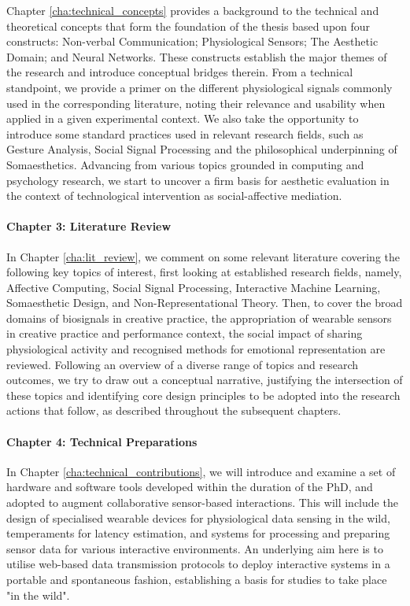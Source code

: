 Chapter \ref{cha:technical_concepts} provides a background to the technical and theoretical concepts that form the foundation of the thesis based upon four constructs: Non-verbal Communication; Physiological Sensors; The Aesthetic Domain; and Neural Networks. These constructs establish the major themes of the research and introduce conceptual bridges therein. From a technical standpoint, we provide a primer on the different physiological signals commonly used in the corresponding literature, noting their relevance and usability when applied in a given experimental context. We also take the opportunity to introduce some standard practices used in relevant research fields, such as Gesture Analysis, Social Signal Processing and the philosophical underpinning of Somaesthetics. Advancing from various topics grounded in computing and psychology research, we start to uncover a firm basis for aesthetic evaluation in the context of technological intervention as social-affective mediation.

\paragraph{Chapter 3: Literature Review}

In Chapter \ref{cha:lit_review}, we comment on some relevant literature covering the following key topics of interest, first looking at established research fields, namely, Affective Computing, Social Signal Processing, Interactive Machine Learning, Somaesthetic Design, and Non-Representational Theory. Then, to cover the broad domains of biosignals in creative practice, the appropriation of wearable sensors in creative practice and performance context, the social impact of sharing physiological activity and recognised methods for emotional representation are reviewed. Following an overview of a diverse range of topics and research outcomes, we try to draw out a conceptual narrative, justifying the intersection of these topics and identifying core design principles to be adopted into the research actions that follow, as described throughout the subsequent chapters. 

\paragraph{Chapter 4: Technical Preparations}

In Chapter \ref{cha:technical_contributions}, we will introduce and examine a set of hardware and software tools developed within the duration of the PhD, and adopted to augment collaborative sensor-based interactions. This will include the design of specialised wearable devices for physiological data sensing in the wild, temperaments for latency estimation, and systems for processing and preparing sensor data for various interactive environments. An underlying aim here is to utilise web-based data transmission protocols to deploy interactive systems in a portable and spontaneous fashion, establishing a basis for studies to take place "in the wild".

